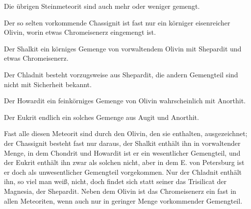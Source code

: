 \documentclass[a4paper, 11pt, oneside]{article}
\begin{document}
Die übrigen Steinmeteorit sind auch mehr oder weniger gemengt.

Der so selten vorkommende Chassignit ist fast nur ein körniger eisenreicher Olivin, worin etwas Chromeisenerz eingemengt ist.

Der Shalkit ein körniges Gemenge von vorwaltendem Olivin mit Shepardit und etwas Chromeisenerz.

Der Chladnit besteht vorzugsweise aus Shepardit, die andern Gemengteil sind nicht mit Sicherheit bekannt.

Der Howardit ein feinkörniges Gemenge von Olivin wahrscheinlich mit Anorthit.

Der Eukrit endlich ein solches Gemenge aus Augit und Anorthit.

Fast alle diesen Meteorit sind durch den Olivin, den sie enthalten, ausgezeichnet; der Chassignit besteht fast nur daraus, der Shalkit enthält ihn in vorwaltender Menge, in dem Chondrit und Howardit ist er ein wesentlicher Gemengteil, und der Eukrit enthält ihn zwar als solchen nicht, aber in dem E. von Petersburg ist er doch als unwesentlicher Gemengteil vorgekommen. Nur der Chladnit enthält ihn, so viel man weiß, nicht, doch findet sich statt seiner das Trisilicat der Magnesia, der Shepardit. Neben dem Olivin ist das Chromeisenerz ein fast in allen Meteoriten, wenn auch nur in geringer Menge vorkommender Gemengteil.
\end{document}
